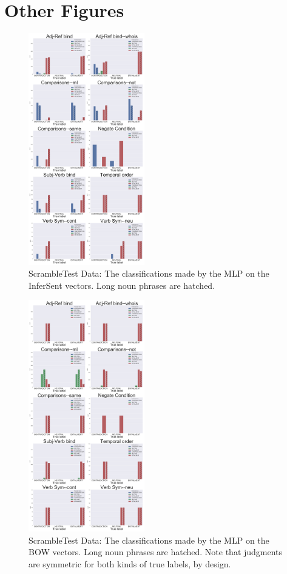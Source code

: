 \documentclass[10pt,letterpaper]{article}
\begin{document}



\newpage
\section*{Other Figures}

\begin{figure}[ht!]
\centering
\includegraphics[width=0.45\textwidth]{AllHistsInferSentMLP.png}
\caption{ScrambleTest Data: The classifications made by the MLP on the InferSent vectors. Long noun phrases are hatched.}
\label{fig:IShistMLP}
\end{figure}


\begin{figure}[ht!]
\centering
\includegraphics[width=0.45\textwidth]{AllHistsBOWMLP.png}
\caption{ScrambleTest Data: The classifications made by the MLP on the BOW vectors. Long noun phrases are hatched. Note that judgments are symmetric for both kinds of true labels, by design.}
\label{fig:BOWhistMLP}
\end{figure}
\end{document}
